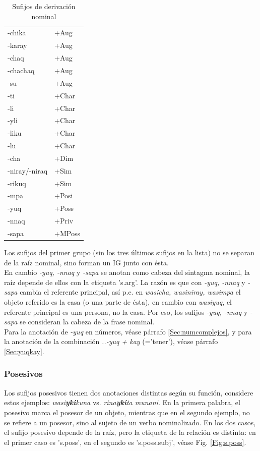 \documentclass[a4paper,11pt,DIV12]{scrartcl}
\begin{document}
\begin{table} 
\caption{Sufijos de derivaci\'on nominal}\label{Tab:NDeriv}
\begin{center}
\begin{tabular}{ll}
\toprule
-chika & +Aug\\
-karay & +Aug\\
-chaq & +Aug\\
-chachaq & +Aug\\
-su & +Aug\\
-ti & +Char\\
-li & +Char\\
-yli & +Char\\
-liku & +Char\\
-lu & +Char\\
-cha & +Dim\\
-niray/-niraq & +Sim\\
-rikuq &  +Sim\\
-mpa & +Posi\\ \midrule
-yuq & +Poss\\
-nnaq & +Priv\\
-sapa & +MPoss\\
\bottomrule
\end{tabular}
\end{center}
\end{table}

Los sufijos del primer grupo (sin los tres \'ultimos sufijos en la lista) no se separan de la ra\'iz nominal, sino forman un IG junto con \'esta.\\
En cambio {\em -yuq, -nnaq} y {\em -sapa} se anotan como cabeza del sintagma nominal, la ra\'iz depende de ellos con la etiqueta 's.arg'. La raz\'on es que con {\em -yuq, -nnaq} y {\em -sapa} cambia el referente principal, as\'i p.e. en {\em wasicha, wasiniray, wasimpa} el objeto referido es la casa (o una parte de \'esta), en cambio con {\em wasiyuq}, el referente principal es una persona, no la casa. Por eso, los sufijos {\em -yuq, -nnaq} y {\em -sapa} se consideran la cabeza de la frase nominal. \\
Para la anotaci\'on de {\em -yuq} en n\'umeros, v\'ease p\'arrafo \ref{Sec:numcomplejos}, y para la anotaci\'on de la combinaci\'on {\em ..-yuq + kay} (='tener'), v\'ease p\'arrafo \ref{Sec:yuqkay}.





\subsubsection{Posesivos} Los sufijos posesivos tienen dos anotaciones distintas seg\'un su funci\'on, considere estos ejemplos: {\em wasi\textbf{yki}kuna} vs. {\em rina\textbf{yki}ta munani}. En la primera palabra, el posesivo marca el posesor de un objeto, mientras que en el segundo ejemplo, no se refiere a un posesor, sino al sujeto de un verbo nominalizado. En los dos casos, el sufijo posesivo depende de la ra\'iz, pero la etiqueta de la relaci\'on es distinta: en el primer caso es 's.poss', en el segundo es 's.poss.subj', v\'ease Fig. \ref{Fig:s.poss}.\\
\end{document}
